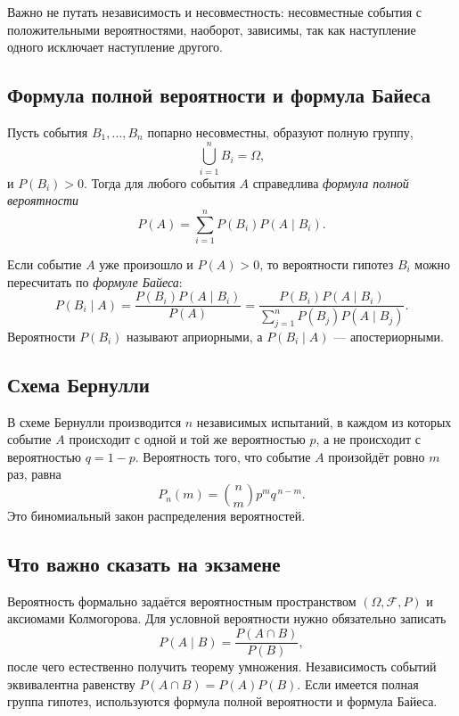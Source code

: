 Важно не путать независимость и несовместность: несовместные события с
положительными вероятностями, наоборот, зависимы, так как наступление одного
исключает наступление другого.

\subsection{Формула полной вероятности и формула Байеса}

Пусть события $B_1,\ldots,B_n$ попарно несовместны, образуют полную группу,
\[
    \bigcup_{i=1}^{n}B_i=\Omega,
\]
и $P(B_i)>0$. Тогда для любого события $A$ справедлива \emph{формула полной
вероятности}
\[
    P(A)=\sum_{i=1}^{n}P(B_i)P(A\mid B_i).
\]

Если событие $A$ уже произошло и $P(A)>0$, то вероятности гипотез $B_i$ можно пересчитать
по \emph{формуле Байеса}:
\[
    P(B_i\mid A)
    =\frac{P(B_i)P(A\mid B_i)}{P(A)}
    =\frac{P(B_i)P(A\mid B_i)}
    {\displaystyle\sum_{j=1}^{n}P(B_j)P(A\mid B_j)}.
\]
Вероятности $P(B_i)$ называют априорными, а $P(B_i\mid A)$ --- апостериорными.

\subsection{Схема Бернулли}

В схеме Бернулли производится $n$ независимых испытаний, в каждом из которых
событие $A$ происходит с одной и той же вероятностью $p$, а не происходит с
вероятностью $q=1-p$. Вероятность того, что событие $A$ произойдёт ровно $m$ раз,
равна
\[
    P_n(m)=\binom{n}{m}p^m q^{\,n-m}.
\]
Это биномиальный закон распределения вероятностей.

\subsection{Что важно сказать на экзамене}

Вероятность формально задаётся вероятностным пространством
$(\Omega,\mathcal F,P)$ и аксиомами Колмогорова. Для условной вероятности нужно
обязательно записать
\[
    P(A\mid B)=\frac{P(A\cap B)}{P(B)},
\]
после чего естественно получить теорему умножения. Независимость событий
эквивалентна равенству $P(A\cap B)=P(A)P(B)$. Если имеется полная группа гипотез,
используются формула полной вероятности и формула Байеса.

\newpage
